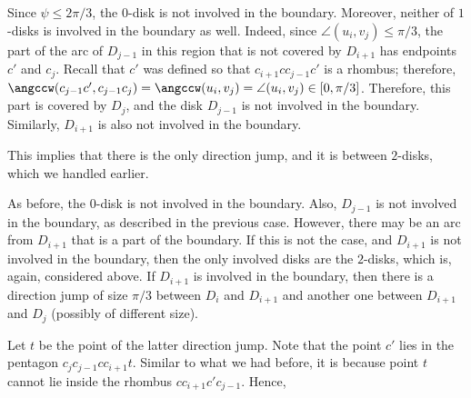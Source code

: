 \begin{enumerate}[label={\bf Case \arabic*: }, wide, labelwidth=!, labelindent=0pt]
Since $\psi\leq 2\pi/3$, the $0$-disk is not involved in the boundary. Moreover, neither of $1$-disks is involved in the boundary as well. Indeed, since $\angle(u_i, v_j)\leq\pi/3$, the part of the arc of $D_{j-1}$ in this region that is not covered by $D_{i+1}$ has endpoints $c'$ and $c_j$. Recall that $c'$ was defined so that $c_{i+1}cc_{j-1}c'$ is a rhombus; therefore, $\angccw(c_{j-1}c', c_{j-1}c_j) = \angccw(u_i, v_j) = \angle(u_i, v_j)\in[0, \pi/3]$. Therefore, this part is covered by $D_j$, and the disk $D_{j-1}$ is not involved in the boundary. Similarly, $D_{i+1}$ is also not involved in the boundary.

This implies that there is the only direction jump, and it is between $2$-disks, which we handled earlier.



As before, the $0$-disk is not involved in the boundary. Also, $D_{j-1}$ is not involved in the boundary, as described in the previous case. However, there may be an arc from $D_{i+1}$ that is a part of the boundary. 
If this is not the case, and $D_{i+1}$ is not involved in the boundary, then the only involved disks are the $2$-disks, which is, again, considered above. If $D_{i+1}$ is involved in the boundary, then there is a direction jump of size $\pi/3$ between $D_i$ and $D_{i+1}$ and another one between $D_{i+1}$ and $D_j$ (possibly of different size).

Let $t$ be the point of the latter direction jump.
Note that the point $c'$ lies in the pentagon $c_{j}c_{j-1}cc_{i+1}t$. Similar to what we had before, it is because point $t$ cannot lie inside the rhombus $cc_{i+1}c'c_{j-1}$. Hence,


\end{enumerate}
